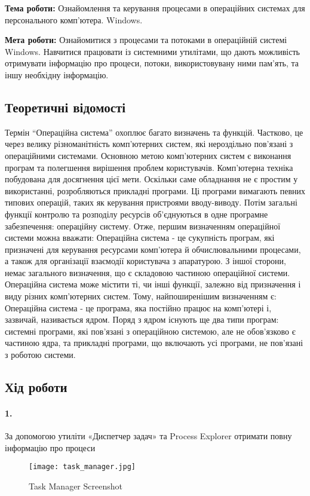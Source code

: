 \documentclass[12pt]{extarticle}
\begin{document}
\textbf{Тема роботи:} Ознайомлення та керування процесами в операційних системах для
персонального комп’ютера. Windows.
\vspace{12pt}

\textbf{Мета роботи:} Ознайомитися з процесами та потоками в операційній системі
Windows. Навчитися працювати із системними утилітами, що дають
можливість отримувати інформацію про процеси, потоки, використовувану
ними пам'ять, та іншу необхідну інформацію.

\subsection*{Теоретичні відомості}
Термін “Операційна система” охоплює багато визначень та функцій.
Частково, це через велику різноманітність комп'ютерних систем, які
нероздільно пов'язані з операційними системами. Основною метою
комп'ютерних систем є виконання програм та полегшення вирішення проблем
користувачів. Комп'ютерна техніка побудована для досягнення цієї мети.
Оскільки саме обладнання не є простим у використанні, розробляються
прикладні програми. Ці програми вимагають певних типових операцій, таких
як керування пристроями вводу-виводу. Потім загальні функції контролю та
розподілу ресурсів об’єднуються в одне програмне забезпечення: операційну
систему. Отже, першим визначенням операційної системи можна вважати:
Операційна система - це сукупність програм, які призначені для
керування ресурсами комп'ютера й обчислювальними процесами, а також для
організації взаємодії користувача з апаратурою.
З іншої сторони, немає загального визначення, що є складовою частиною
операційної системи. Операційна система може містити ті, чи інші функції,
залежно від призначення і виду різних комп'ютерних систем. Тому,
найпоширенішим визначенням є:
Операційна система - це програма, яка постійно працює на комп'ютері і,
зазвичай, називається ядром.
Поряд з ядром існують ще два типи програм: системні програми, які
пов'язані з операційною системою, але не обов'язково є частиною ядра, та
прикладні програми, що включають усі програми, не пов'язані з роботою
системи.

\subsection*{Хід роботи}


\paragraph{1.}
За допомогою утиліти «Диспетчер задач» та Process Explorer отримати
повну інформацію про процеси
\begin{figure}[H]
    \centering
    \texttt{[image: task\_manager.jpg]}
    \caption{Task Manager Screenshot}
\end{figure}
\end{document}
